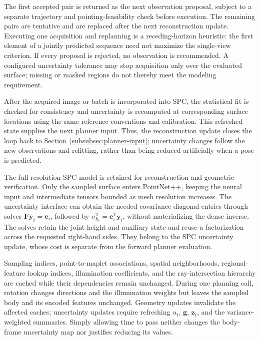 The first accepted pair is returned as the next observation proposal, subject to a separate trajectory and pointing-feasibility check before execution. The remaining pairs are tentative and are replaced after the next reconstruction update. Executing one acquisition and replanning is a receding-horizon heuristic: the first element of a jointly predicted sequence need not maximize the single-view criterion. If every proposal is rejected, no observation is recommended. A configured uncertainty tolerance may stop acquisition only over the evaluated surface; missing or masked regions do not thereby meet the modeling requirement.

After the acquired image or batch is incorporated into SPC, the statistical fit is checked for consistency and uncertainty is recomputed at corresponding surface locations using the same reference conventions and calibration. This refreshed state supplies the next planner input. Thus, the reconstruction update closes the loop back to Section~\ref{subsubsec:planner-input}; uncertainty changes follow the new observations and refitting, rather than being reduced artificially when a pose is predicted.

The full-resolution SPC model is retained for reconstruction and geometric verification. Only the sampled surface enters PointNet++, keeping the neural input and intermediate tensors bounded as mesh resolution increases. The uncertainty interface can obtain the needed covariance diagonal entries through solves $\mathbf F\mathbf y_i=\mathbf e_i$, followed by $\sigma_{h_i}^2=\mathbf e_i^T\mathbf y_i$, without materializing the dense inverse. The solves retain the joint height and auxiliary state and reuse a factorization across the requested right-hand sides. They belong to the SPC uncertainty update, whose cost is separate from the forward planner evaluation.

Sampling indices, point-to-maplet associations, spatial neighborhoods, regional-feature lookup indices, illumination coefficients, and the ray-intersection hierarchy are cached while their dependencies remain unchanged. During one planning call, rotation changes directions and the illumination weights but leaves the sampled body and its encoded features unchanged. Geometry updates invalidate the affected caches; uncertainty updates require refreshing $u_i$, $\mathbf g$, $\mathbf z_i$, and the variance-weighted summaries. Simply allowing time to pass neither changes the body-frame uncertainty map nor justifies reducing its values.

